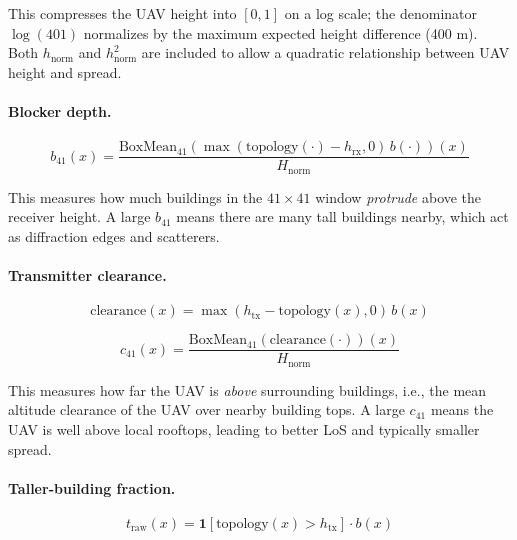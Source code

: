 \documentclass[11pt,a4paper]{article}
\begin{document}
This compresses the UAV height into $[0, 1]$ on a log scale; the denominator
$\log(401)$ normalizes by the maximum expected height difference (400 m).
Both $h_{\mathrm{norm}}$ and $h_{\mathrm{norm}}^2$ are included to allow a
quadratic relationship between UAV height and spread.

\paragraph{Blocker depth.}

\begin{equation}
b_{41}(x)=
\frac{\mathrm{BoxMean}_{41}\!\left(\max(\mathrm{topology}(\cdot)-h_{\mathrm{rx}},0)\,b(\cdot)\right)(x)}
{H_{\mathrm{norm}}}
\label{eq:b41}
\end{equation}

This measures how much buildings in the $41\times 41$ window \emph{protrude}
above the receiver height. A large $b_{41}$ means there are many tall
buildings nearby, which act as diffraction edges and scatterers.

\paragraph{Transmitter clearance.}

\begin{equation}
\mathrm{clearance}(x)=\max(h_{\mathrm{tx}}-\mathrm{topology}(x),0)\,b(x)
\label{eq:clearance}
\end{equation}

\begin{equation}
c_{41}(x)=
\frac{\mathrm{BoxMean}_{41}\!\left(\mathrm{clearance}(\cdot)\right)(x)}
{H_{\mathrm{norm}}}
\label{eq:c41}
\end{equation}

This measures how far the UAV is \emph{above} surrounding buildings, i.e.,
the mean altitude clearance of the UAV over nearby building tops. A large
$c_{41}$ means the UAV is well above local rooftops, leading to better LoS
and typically smaller spread.

\paragraph{Taller-building fraction.}

\begin{equation}
t_{\mathrm{raw}}(x)=
\mathbf{1}\!\left[\mathrm{topology}(x)>h_{\mathrm{tx}}\right]\cdot b(x)
\label{eq:t_raw}
\end{equation}
\end{document}
